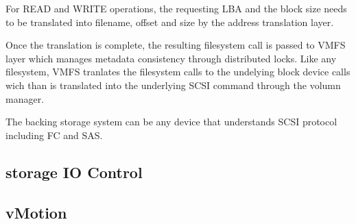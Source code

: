 For READ and WRITE operations, the requesting LBA and the block size needs to be translated into filename, offset and size by the address translation layer. 

Once the translation is complete, the resulting filesystem call is passed to VMFS layer which manages metadata consistency through distributed locks. 
Like any filesystem, VMFS tranlates the filesystem calls to the undelying block device calls wich than is translated into the underlying SCSI command through the volumn manager. 

The backing storage system can be any device that understands SCSI protocol including FC and SAS. 

\subsection{storage IO Control}


\subsection{vMotion}



